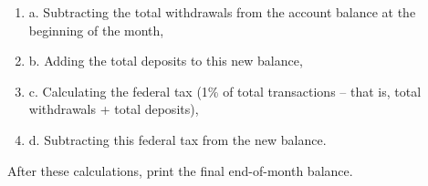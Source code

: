 \documentclass[]{book}
\begin{document}
\begin{enumerate}
    \begin{enumerate}

        \item a. Subtracting the total withdrawals from the account balance at the beginning of the month, 
        \item b. Adding the total deposits to this new balance,
        \item c. Calculating the federal tax (1\% of total transactions – that is, total withdrawals + total deposits),
        \item d. Subtracting this federal tax from the new balance.

    \end{enumerate}

After these calculations, print the final end-of-month balance.

\end{enumerate}
\end{document}
